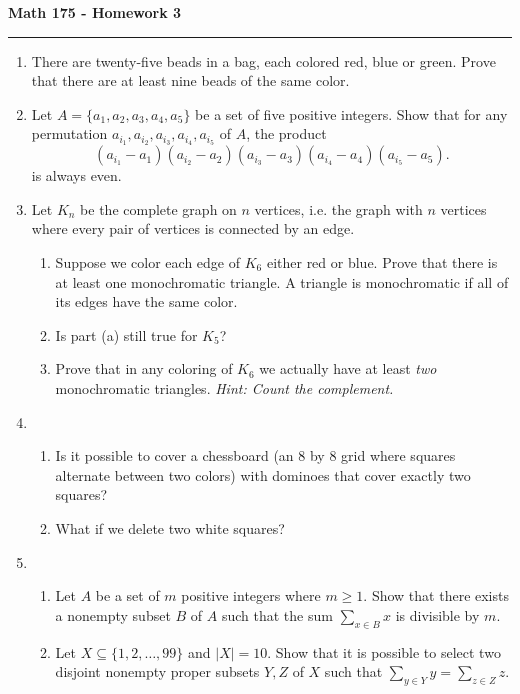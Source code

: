\documentclass[11pt,letterpaper]{report}
\begin{document}
\begin{center}
{\bf \Large Math 175 - Homework 3}
\vspace{0.2cm}
\hrule
\end{center}

\begin{enumerate}
	\item There are twenty-five beads in a bag, each colored red, blue or green. Prove that there are at least nine beads of the same color.
	\vfill

	\item Let $A = \{a_1, a_2, a_3, a_4, a_5\}$ be a set of five positive integers. Show that for any permutation $a_{i_1}, a_{i_2}, a_{i_3}, a_{i_4}, a_{i_5}$ of $A$, the product
	\[
	(a_{i_1}-a_1)(a_{i_2}-a_2)(a_{i_3}-a_3)(a_{i_4}-a_4)(a_{i_5}-a_5).
	\]
	is always even.
	\vfill
	\item Let $K_n$ be the complete graph on $n$ vertices, i.e. the graph with $n$ vertices where every pair of vertices is connected by an edge. 
	\begin{enumerate}
		\item Suppose we color each edge of $K_6$ either red or blue. Prove that there is at least one monochromatic triangle. A triangle is monochromatic if all of its edges have the same color.
		\item Is part (a) still true for $K_5$?
		\item Prove that in any coloring of $K_6$ we actually have at least \textit{two} monochromatic triangles. \textit{Hint: Count the complement.}
	\end{enumerate}
	\vfill

	\item \begin{enumerate}
		\item Is it possible to cover a chessboard (an 8 by 8 grid where squares alternate between two colors) with dominoes that cover exactly two squares?
		\item What if we delete two white squares?
	\end{enumerate}

	\vfill
	
	\item \begin{enumerate}
		\item Let $A$ be a set of $m$ positive integers where $m\geq 1$. Show that there exists a nonempty subset $B$ of $A$ such that the sum $\sum_{x\in B}x$ is divisible by $m$.
		\item Let $X\subseteq \{1, 2, \ldots, 99\}$ and $|X| = 10$. Show that it is possible to select two disjoint nonempty proper subsets $Y, Z$ of $X$ such that $\sum_{y\in Y}y = \sum_{z\in Z}z$.
	\end{enumerate}
	\vfill
\end{enumerate}
\end{document}
